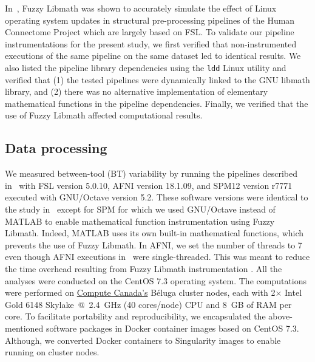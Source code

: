 \documentclass[11pt,onecolumn]{article}
\begin{document}
In~\cite{salari2021accurate}, Fuzzy Libmath was shown to accurately
simulate the effect of Linux operating system updates in structural
pre-processing pipelines of the Human Connectome Project which are largely based on FSL.
To validate our pipeline instrumentations for the present study, we first verified that non-instrumented
executions of the same pipeline on the same dataset led to identical
results. We also listed the pipeline
library dependencies using the \texttt{ldd} Linux utility and verified that
(1) the tested pipelines were dynamically linked to the GNU libmath library, and
(2) there was no alternative implementation of elementary mathematical functions in the pipeline dependencies.
Finally, we verified that the use of Fuzzy Libmath affected computational results.

\subsection{Data processing}

We measured between-tool (BT) variability by running the pipelines
described in~\cite{bowring2019exploring} with FSL version 5.0.10, AFNI
version 18.1.09, and SPM12 version r7771 executed with GNU/Octave version
5.2. These software versions were identical to the study
in~\cite{bowring2019exploring} except for SPM for which we used GNU/Octave
instead of MATLAB to enable mathematical function instrumentation using
Fuzzy Libmath. Indeed, MATLAB uses its own built-in mathematical functions,
which prevents the use of Fuzzy Libmath. In AFNI, we set the number of
threads to 7 even though AFNI executions
in~\cite{bowring2019exploring} were single-threaded. This was meant to
reduce the time overhead resulting from Fuzzy Libmath instrumentation
.
All the analyses were conducted on the CentOS 7.3 operating system. The
computations were performed on \href{https://www.computecanada.ca}{Compute
  Canada's} Béluga cluster nodes, each with 2$\times$ Intel Gold 6148 Skylake~@~2.4~GHz
(40 cores/node) CPU and 8~GB of RAM per core. To facilitate portability and reproducibility,
we encapsulated the
above-mentioned software packages in Docker container images based on CentOS 7.3.
Although, we converted Docker containers to Singularity images to enable running on cluster nodes.
\end{document}
